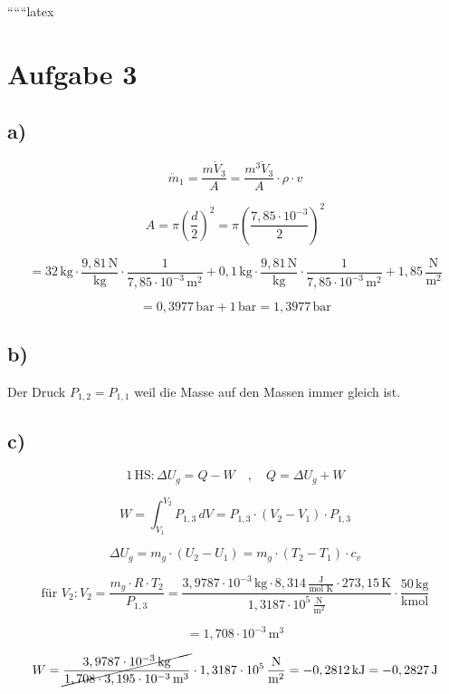 
``````latex


\section*{Aufgabe 3}

\subsection*{a)}

\[
\dot{m}_{1} = \frac{m \dot{V}_{3}}{A} = \frac{m^3 \dot{V}_{3}}{A} \cdot \rho \cdot v
\]

\[
A = \pi \left( \frac{d}{2} \right)^2 = \pi \left( \frac{7,85 \cdot 10^{-3}}{2} \right)^2
\]

\[
= 32 \, \text{kg} \cdot \frac{9,81 \, \text{N}}{\text{kg}} \cdot \frac{1}{7,85 \cdot 10^{-3} \, \text{m}^2} + 0,1 \, \text{kg} \cdot \frac{9,81 \, \text{N}}{\text{kg}} \cdot \frac{1}{7,85 \cdot 10^{-3} \, \text{m}^2} + 1,85 \, \frac{\text{N}}{\text{m}^2}
\]

\[
= 0,3977 \, \text{bar} + 1 \, \text{bar} = 1,3977 \, \text{bar}
\]

\subsection*{b)}

Der Druck \( P_{1,2} = P_{1,1} \) weil die Masse auf den Massen immer gleich ist.

\subsection*{c)}

\[
1 \, \text{HS} : \Delta U_{g} = Q - W \quad , \quad Q = \Delta U_{g} + W
\]

\[
W = \int_{V_{1}}^{V_{2}} P_{1,3} \, dV = P_{1,3} \cdot (V_{2} - V_{1}) \cdot P_{1,3}
\]

\[
\Delta U_{g} = m_{g} \cdot (U_{2} - U_{1}) = m_{g} \cdot (T_{2} - T_{1}) \cdot c_{v}
\]

\[
\text{für } V_{2} : V_{2} = \frac{m_{g} \cdot R \cdot T_{2}}{P_{1,3}} = \frac{3,9787 \cdot 10^{-3} \, \text{kg} \cdot 8,314 \, \frac{\text{J}}{\text{mol K}} \cdot 273,15 \, \text{K}}{1,3187 \cdot 10^{5} \, \frac{\text{N}}{\text{m}^2}} \cdot \frac{50 \, \text{kg}}{\text{kmol}}
\]

\[
= 1,708 \cdot 10^{-3} \, \text{m}^3
\]

\[
W = \cancel{\frac{3,9787 \cdot 10^{-3} \, \text{kg}}{1,708 \cdot 3,195 \cdot 10^{-3} \, \text{m}^3}} \cdot 1,3187 \cdot 10^{5} \, \frac{\text{N}}{\text{m}^2} = -0,2812 \, \text{kJ} = -0,2827 \, \text{J}
\]

